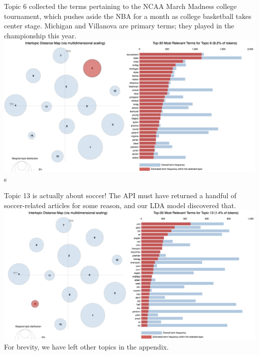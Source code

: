 \documentclass[11pt]{article}
\begin{document}
Topic 6 collected the terms pertaining to the NCAA March Madness college tournament, which pushes aside the NBA for a month as college basketball takes center stage.  Michigan and Villanova are primary terms; they played in the championship this year. \\
\includegraphics[width=470pt]{6.png} \\s

Topic 13 is actually about soccer!  The API must have returned a handful of soccer-related articles for some reason, and our LDA model discovered that. \\
\includegraphics[width=470pt]{13.png} \\

For brevity, we have left other topics in the appendix.
\end{document}
